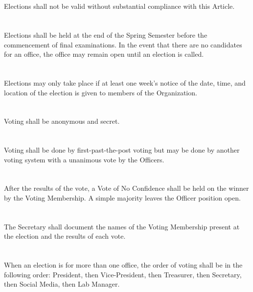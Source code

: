 \documentclass[12pt]{cls/constitution}
\begin{document}

\section{}
Elections shall not be valid without substantial compliance with this Article. 

\section{}
Elections shall be held at the end of the Spring Semester before the commencement of final examinations.  In the event that there are no candidates for an office, the office may remain open until an election is called.

\section{}
Elections may only take place if at least one week’s notice of the date, time, and location of the election is given to members of the Organization.

\section{}
Voting shall be anonymous and secret.

\section{}
Voting shall be done by first-past-the-post voting but may be done by another voting system with a unanimous vote by the Officers.

\section{}
After the results of the vote, a Vote of No Confidence shall be held on the winner by the Voting Membership. A simple majority leaves the Officer position open.

\section{}
The Secretary shall document the names of the Voting Membership present at the election and the results of each vote.

\section{}
When an election is for more than one office, the order of voting shall be in the following order: President, then Vice-President, then Treasurer, then Secretary, then Social Media, then Lab Manager.
\end{document}
